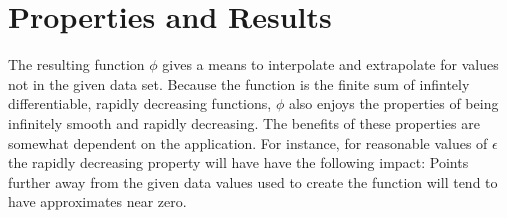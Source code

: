 \documentclass{article}
\begin{document}
\section*{Properties and Results}
The resulting function $\phi$ gives a means to interpolate and extrapolate for values not in the given data set.
Because the function is the finite sum of infintely differentiable, rapidly decreasing functions, $\phi$ also 
enjoys the properties of being infinitely smooth and rapidly decreasing. The benefits of these properties
are somewhat dependent on the application. For instance, for reasonable values of $\epsilon$ the rapidly 
decreasing property will have have the following impact: Points further away from the given data values
used to create the function will tend to have approximates near zero. 
\end{document}
